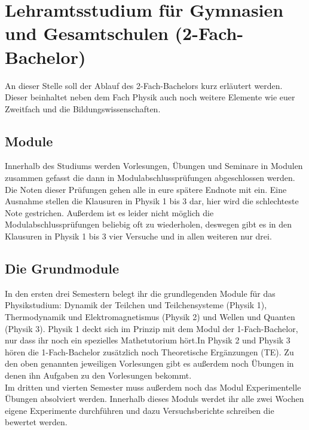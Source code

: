 \section[Lehramtsstudium für Gymnasien \& Gesamtschulen (2-Fach-Bachelor)]{Lehramtsstudium für Gymnasien und Gesamtschulen (2-Fach-Bachelor)}
\begin{multicols*}{2}
An dieser Stelle soll der Ablauf des 2-Fach-Bachelors kurz erläutert werden. Dieser beinhaltet neben dem Fach Physik auch noch weitere Elemente wie euer Zweitfach und die Bildungswissenschaften.
\subsection*{Module}
Innerhalb des Studiums werden Vorlesungen, Übungen und Seminare in Modulen zusammen gefasst die dann in Modulabschlussprüfungen abgeschlossen werden. Die Noten dieser Prüfungen gehen alle in eure spätere Endnote mit ein. Eine Ausnahme stellen die Klausuren in Physik 1 bis 3 dar, hier wird die schlechteste Note gestrichen. Außerdem ist es leider nicht möglich die Modulabschlussprüfungen beliebig oft zu wiederholen, deswegen gibt es in den Klausuren in Physik 1 bis 3 vier Versuche und in allen weiteren nur drei.
\subsection*{Die Grundmodule}
In den ersten drei Semestern belegt ihr die grundlegenden Module für das Physikstudium: Dynamik der Teilchen und Teilchensysteme (Physik 1), Thermodynamik und Elektromagnetismus (Physik 2) und Wellen und Quanten (Physik 3). Physik 1 deckt sich im Prinzip mit dem Modul der 1-Fach-Bachelor, nur dass ihr noch ein spezielles Mathetutorium hört.In Physik 2 und Physik 3 hören die 1-Fach-Bachelor zusätzlich noch Theoretische Ergänzungen (TE). Zu den oben genannten jeweiligen Vorlesungen gibt es außerdem noch Übungen in denen ihn Aufgaben zu den Vorlesungen bekommt.\\ Im dritten und vierten Semester muss außerdem noch das Modul Experimentelle Übungen absolviert werden. Innerhalb dieses Moduls werdet ihr alle zwei Wochen eigene Experimente durchführen und dazu Versuchsberichte schreiben die bewertet werden.

\end{multicols*}
